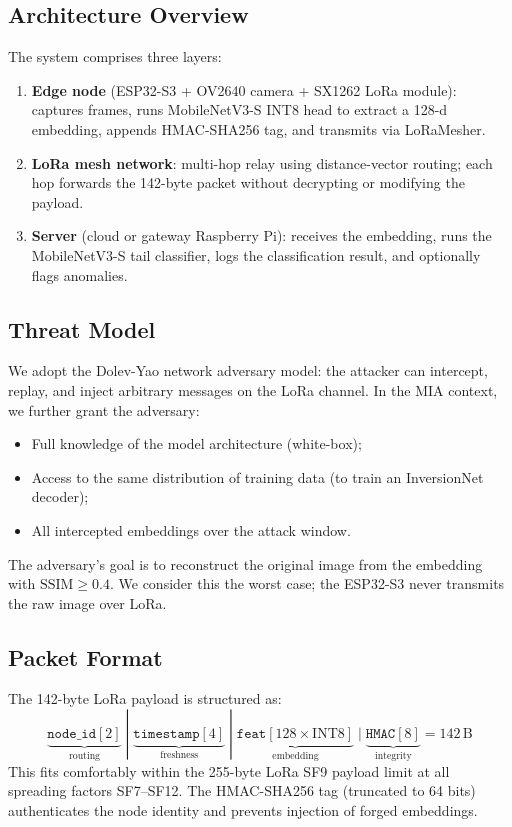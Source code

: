 \documentclass[journal]{IEEEtran}
\newcommand{\ssim}{\mathrm{SSIM}}
\newcommand{\MN}{MobileNetV3-S\xspace}
\begin{document}
\subsection{Architecture Overview}

The system comprises three layers:

\begin{enumerate}
  \item \textbf{Edge node} (ESP32-S3 + OV2640 camera + SX1262 LoRa module):
    captures frames, runs \MN INT8 head to extract a 128-d embedding,
    appends HMAC-SHA256 tag, and transmits via LoRaMesher.
  \item \textbf{LoRa mesh network}: multi-hop relay using distance-vector
    routing; each hop forwards the 142-byte packet without decrypting or
    modifying the payload.
  \item \textbf{Server} (cloud or gateway Raspberry Pi): receives the
    embedding, runs the \MN tail classifier, logs the classification
    result, and optionally flags anomalies.
\end{enumerate}

\subsection{Threat Model}

We adopt the Dolev-Yao network adversary model: the attacker can
intercept, replay, and inject arbitrary messages on the LoRa channel.
In the MIA context, we further grant the adversary:
\begin{itemize}
  \item Full knowledge of the model architecture (white-box);
  \item Access to the same distribution of training data (to train an
    InversionNet decoder);
  \item All intercepted embeddings over the attack window.
\end{itemize}
The adversary's goal is to reconstruct the original image from the
embedding with $\ssim \geq 0.4$.
We consider this the worst case; the ESP32-S3 never transmits the
raw image over LoRa.

\subsection{Packet Format}

The 142-byte LoRa payload is structured as:
\begin{equation}
  \underbrace{\texttt{node\_id}[2]}_{\text{routing}}
  \;|\;
  \underbrace{\texttt{timestamp}[4]}_{\text{freshness}}
  \;|\;
  \underbrace{\texttt{feat}[128 \times \text{INT8}]}_{\text{embedding}}
  \;|\;
  \underbrace{\texttt{HMAC}[8]}_{\text{integrity}}
  = 142\,\text{B}
  \label{eq:pktformat}
\end{equation}
This fits comfortably within the 255-byte LoRa SF9 payload limit at
all spreading factors SF7--SF12.
The HMAC-SHA256 tag (truncated to 64 bits) authenticates the
node identity and prevents injection of forged embeddings.
\end{document}
